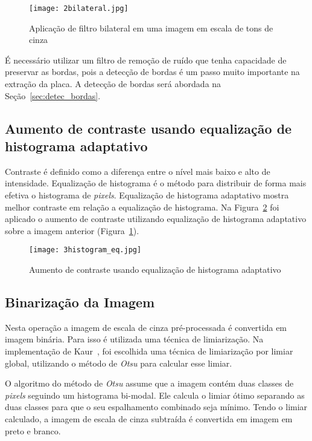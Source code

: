 \begin{figure}[H]
	\centering
	\texttt{[image: 2bilateral.jpg]}
	\caption{Aplicação de filtro bilateral em uma imagem em escala de tons de cinza}
	\label{fig:ext_filter_in_gray_scale}
\end{figure}

É necessário utilizar um filtro de remoção de ruído que tenha capacidade de
preservar as bordas, pois a detecção de bordas é um passo muito importante na
extração da placa. A detecção de bordas será abordada na
Seção~\ref{sec:detec_bordas}.

\subsection{Aumento de contraste usando equalização de histograma adaptativo}

Contraste é definido como a diferença entre o nível mais baixo e alto de
intensidade. Equalização de histograma é o método para distribuir de forma mais
efetiva o histograma de \emph{pixels}. Equalização de histograma adaptativo
mostra melhor contraste em relação a equalização de histograma. Na
Figura~\ref{fig:ext_contrast_adaptive_histogram} foi aplicado o aumento de
contraste utilizando equalização de histograma adaptativo sobre a imagem
anterior (Figura~\ref{fig:ext_filter_in_gray_scale}).

\begin{figure}[H]
	\centering
	\texttt{[image: 3histogram\_eq.jpg]}
	\caption{Aumento de contraste usando equalização de histograma adaptativo}
	\label{fig:ext_contrast_adaptive_histogram}
\end{figure}

\subsection{Binarização da Imagem}

Nesta operação a imagem de escala de cinza pré-processada é convertida em imagem
binária. Para isso é utilizada uma técnica de limiarização. Na implementação de
Kaur~\cite{kaur2014efficient}, foi escolhida uma técnica de limiarização por
limiar global, utilizando o método de \emph{Otsu} para calcular esse limiar.

O algoritmo do método de \emph{Otsu} assume que  a imagem contém duas classes de
\emph{pixels} seguindo um histograma bi-modal. Ele calcula o limiar ótimo
separando as duas classes para que o seu espalhamento combinado seja mínimo.
Tendo o limiar calculado, a imagem de escala de cinza subtraída é convertida em
imagem em preto e branco.

